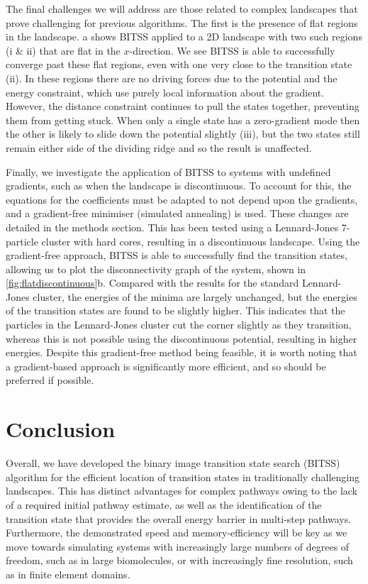 \documentclass[twocolumn,10pt]{revtex4}
\begin{document}
The final challenges we will address are those related to complex landscapes that prove challenging for previous algorithms.
The first is the presence of flat regions in the landscape.
a shows BITSS applied to a 2D landscape with two such regions (i \& ii) that are flat in the $x$-direction.
We see BITSS is able to successfully converge past these flat regions, even with one very close to the transition state (ii).
In these regions there are no driving forces due to the potential and the energy constraint, which use purely local information about the gradient.
However, the distance constraint continues to pull the states together, preventing them from getting stuck.
When only a single state has a zero-gradient mode then the other is likely to slide down the potential slightly (iii), but the two states still remain either side of the dividing ridge and so the result is unaffected.

Finally, we investigate the application of BITSS to systems with undefined gradients, such as when the landscape is discontinuous.
To account for this, the equations for the coefficients must be adapted to not depend upon the gradients, and a gradient-free minimiser (simulated annealing) is used.
These changes are detailed in the methods section.
This has been tested using a Lennard-Jones 7-particle cluster with hard cores, resulting in a discontinuous landscape.
Using the gradient-free approach, BITSS is able to successfully find the transition states, allowing us to plot the disconnectivity graph of the system, shown in \cref{fig:flatdiscontinuous}b.
Compared with the results for the standard Lennard-Jones cluster, the energies of the minima are largely unchanged, but the energies of the transition states are found to be slightly higher.
This indicates that the particles in the Lennard-Jones cluster cut the corner slightly as they transition, whereas this is not possible using the discontinuous potential, resulting in higher energies.
Despite this gradient-free method being feasible, it is worth noting that a gradient-based approach is significantly more efficient, and so should be preferred if possible.


\section{Conclusion}
Overall, we have developed the binary image transition state search (BITSS) algorithm for the efficient location of transition states in traditionally challenging landscapes.
This has distinct advantages for complex pathways owing to the lack of a required initial pathway estimate, as well as the identification of the transition state that provides the overall energy barrier in multi-step pathways.
Furthermore, the demonstrated speed and memory-efficiency will be key as we move towards simulating systems with increasingly large numbers of degrees of freedom, such as in large biomolecules, or with increasingly fine resolution, such as in finite element domains.
\end{document}
